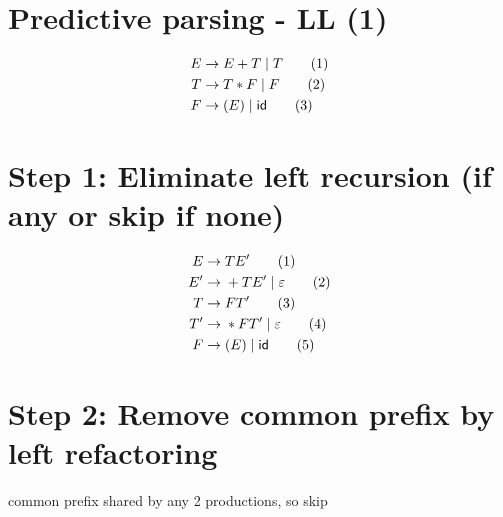 \documentclass[10pt,a4paper,landscape]{article}
\begin{document}
\pagestyle{empty}
\begin{multicols*}{3}
\section*{Predictive parsing - LL (1)}
\begin{align*}
  E \to\;& E + T \;|\; T         \tag{1} \\
  T \to\;& T * F \;|\; F         \tag{2} \\
  F \to\;& (E) \;|\; \mathsf{id} \tag{3}
\end{align*}
\section*{Step 1: Eliminate left recursion (if any or skip if none)}
\begin{align*}
  E  \to&\; TE'                    \tag{1} \\
  E' \to&\; + TE' \;|\; \varepsilon \tag{2} \\
  T  \to&\; FT'                    \tag{3} \\
  T' \to&\; * FT' \;|\; \varepsilon \tag{4} \\
  F  \to&\; (E) \;|\; \mathsf{id}   \tag{5}
\end{align*}
\section*{Step 2: Remove common prefix by left refactoring}
 common prefix shared by any 2 productions, so skip
\end{multicols*}
\end{document}
